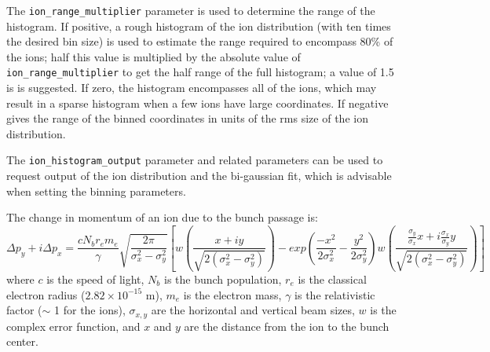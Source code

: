 The \verb|ion_range_multiplier| parameter is used to determine the range of the histogram.
If positive, a rough histogram of the ion distribution (with ten times the desired bin size) is used to
estimate the range required to encompass 80\% of the ions; half this value is multiplied
by the absolute value of \verb|ion_range_multiplier| to get the half range of the
full histogram; a value of 1.5 is is suggested.
If zero, the histogram encompasses all of the ions, which may result in a sparse histogram
when a few ions have large coordinates.
If negative gives the range of the binned coordinates in 
units of the rms size of the ion distribution.

The \verb|ion_histogram_output| parameter and related parameters can be used to 
request output of the ion distribution and the bi-gaussian fit, which is advisable
when setting the binning parameters.

The change in momentum of an ion due to the bunch passage is:
\begin{equation}
\Delta p_y + i \Delta p_x  = \frac{c N_b r_e m_e }{\gamma} \sqrt{\frac{2 \pi}{\sigma_x^2 - \sigma_y^2}} \left[ w\left(\frac{x + i y}{\sqrt{2 (\sigma_x^2 - \sigma_y^2)}}\right) 
   - exp\left(\frac{-x^2}{2 \sigma_x^2} - \frac{y^2}{2 \sigma_y^2}\right)  w\left(\frac{\frac{\sigma_y}{\sigma_x} x + i \frac{\sigma_x}{\sigma_y} y}{\sqrt{2 (\sigma_x^2 - \sigma_y^2)}}\right) \right]
\end{equation}
where $c$ is the speed of light, $N_b$ is the bunch population, $r_e$
is the classical electron radius ($2.82 \times 10^{-15}$ m), $m_e$ is
the electron mass, $\gamma$ is the relativistic factor ($\sim$ 1 for
the ions), $\sigma_{x,y}$ are the horizontal and vertical beam sizes,
$w$ is the complex error function, and $x$ and $y$ are the distance
from the ion to the bunch center.
